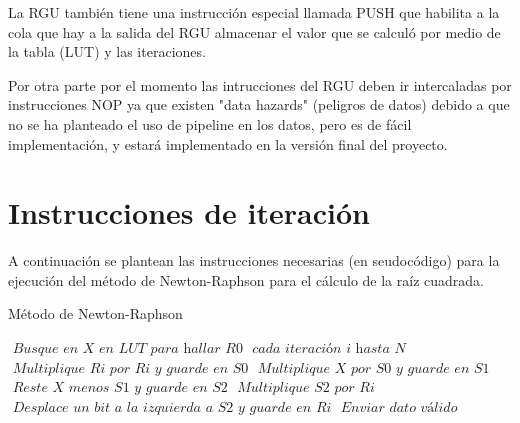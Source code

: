 La RGU también tiene una instrucción especial llamada PUSH que  habilita a la cola que hay a la salida del RGU almacenar el valor que se calculó por medio de la tabla (LUT) y las iteraciones.

Por otra parte por el momento las intrucciones del RGU deben ir intercaladas por instrucciones NOP ya que existen "data hazards" (peligros de datos) debido a que no se ha planteado el uso de pipeline en los datos, pero es de fácil implementación, y estará implementado en la versión final del proyecto.

\section{Instrucciones de iteración}

A continuación se plantean las instrucciones necesarias (en seudocódigo) para la ejecución del método de Newton-Raphson para el cálculo de la raíz cuadrada. 

\begin{algorithm}
\caption{Método de Newton-Raphson}\label{ray}
\begin{algorithmic}[1]
\State $\textit{ Busque en X en LUT para hallar R0}$
\For $\textit{ cada iteración i hasta N}$
\State $\textit{ Multiplique Ri por Ri y guarde en S0}$
\State $\textit{ Multiplique X por S0 y guarde en S1}$
\State $\textit{ Reste X menos S1 y guarde en S2}$
\State $\textit{ Multiplique S2 por Ri}$
\State $\textit{ Desplace un bit a la izquierda a S2 y guarde en Ri}$
\EndFor
\State $\textit{ Enviar dato válido}$
\EndProcedure
\end{algorithmic}
\end{algorithm}

